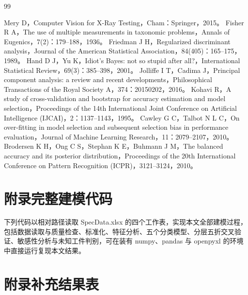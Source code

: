 \documentclass[12pt,a4paper]{article}
\newcommand{\appentry}[2]{附录\makebox[1.5em][l]{#1}#2}
\renewcommand{\thetable}{\arabic{section}-\arabic{table}}
\begin{document}
\clearpage
\begin{thebibliography}{99}
 Mery D，Computer Vision for X-Ray Testing，Cham：Springer，2015。
 Fisher R A，The use of multiple measurements in taxonomic problems，Annals of Eugenics，7(2)：179--188，1936。
 Friedman J H，Regularized discriminant analysis，Journal of the American Statistical Association，84(405)：165--175，1989。
 Hand D J，Yu K，Idiot's Bayes: not so stupid after all?，International Statistical Review，69(3)：385--398，2001。
 Jolliffe I T，Cadima J，Principal component analysis: a review and recent developments，Philosophical Transactions of the Royal Society A，374：20150202，2016。
 Kohavi R，A study of cross-validation and bootstrap for accuracy estimation and model selection，Proceedings of the 14th International Joint Conference on Artificial Intelligence (IJCAI)，2：1137--1143，1995。
 Cawley G C，Talbot N L C，On over-fitting in model selection and subsequent selection bias in performance evaluation，Journal of Machine Learning Research，11：2079--2107，2010。
 Brodersen K H，Ong C S，Stephan K E，Buhmann J M，The balanced accuracy and its posterior distribution，Proceedings of the 20th International Conference on Pattern Recognition (ICPR)，3121--3124，2010。
\end{thebibliography}

\newpage
\section*{\appentry{A}{完整建模代码}}

下列代码以相对路径读取 SpecData.xlsx 的四个工作表，实现本文全部建模过程，包括数据读取与质量检查、标准化、特征分析、五个分类模型、分层五折交叉验证、敏感性分析与未知工件判别，可在装有 numpy、pandas 与 openpyxl 的环境中直接运行复现本文结果。



\newpage
\section*{\appentry{B}{补充结果表}}
\setcounter{table}{0}
\renewcommand{\thetable}{B-\arabic{table}}
\end{document}
